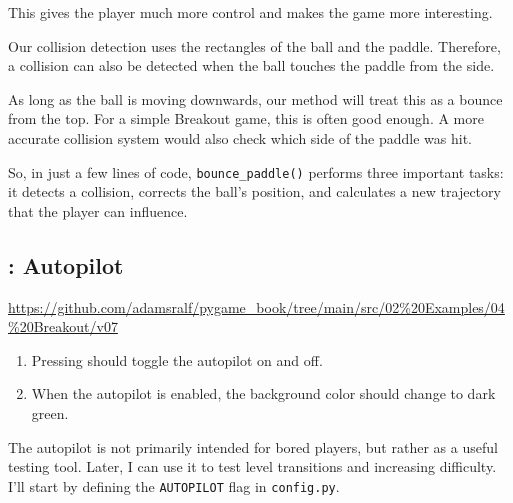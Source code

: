 This gives the player much more control and makes the game more interesting.

\begin{warningbox}
	Our collision detection uses the rectangles of the ball and the paddle. Therefore, a collision can also be detected when the ball touches the paddle from the side.
	
	As long as the ball is moving downwards, our method will treat this as a bounce from the top. For a simple Breakout game, this is often good enough. A more accurate collision system would also check which side of the paddle was hit.
\end{warningbox}

So, in just a few lines of code, \texttt{bounce\_paddle()} performs three important tasks: it detects a collision, corrects the ball's position, and calculates a new trajectory that the player can influence.

\newpage
{}


\subsection{: Autopilot}

\begin{diskbox}
	\url{https://github.com/adamsralf/pygame_book/tree/main/src/02%20Examples/04%20Breakout/v07}
\end{diskbox}

\begin{enumerate}
	\item Pressing  should toggle the autopilot on and off.
	\item When the autopilot is enabled, the background color should change to dark green.
\end{enumerate}
\er

The autopilot is not primarily intended for bored players, but rather as a useful testing tool. Later, I can use it to test level transitions and increasing difficulty. I'll start by defining the \texttt{AUTOPILOT} flag in \texttt{config.py}.


